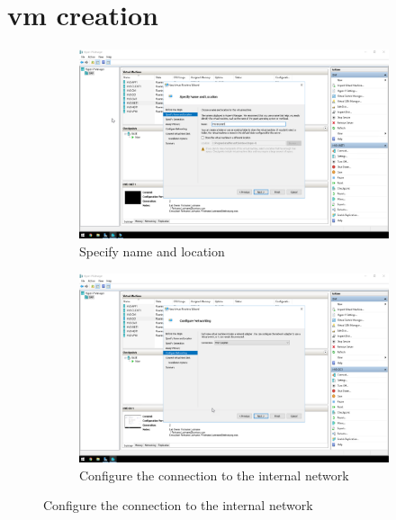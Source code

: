 \label{Migration}
\section{\acrfull{vm} creation}
\begin{figure}[!htb]
	\begin{subfigure}{0.5\textwidth}
		\captionsetup{width=0.8\linewidth}
		\includegraphics[width=0.9\linewidth]{img/Methodologie/Migration0.png}
		\centering
		\caption{Specify name and location}
	\end{subfigure}
	\begin{subfigure}{0.5\textwidth}
		\captionsetup{width=0.8\linewidth}
		\includegraphics[width=0.9\linewidth]{img/Methodologie/Migration1.png} 
		\centering
		\caption{Configure the connection to the internal network}
	\end{subfigure}
\end{figure}
